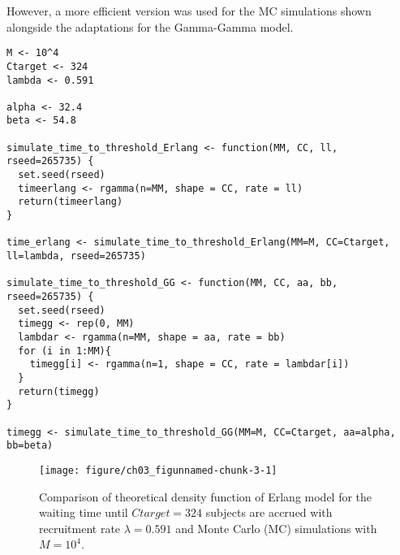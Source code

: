 However, a more efficient version was used for the MC simulations shown alongside the adaptations for the Gamma-Gamma model.

\begin{knitrout}
\color{fgcolor}\begin{kframe}
\begin{verbatim}
M <- 10^4
Ctarget <- 324
lambda <- 0.591

alpha <- 32.4
beta <- 54.8

simulate_time_to_threshold_Erlang <- function(MM, CC, ll, rseed=265735) {
  set.seed(rseed)
  timeerlang <- rgamma(n=MM, shape = CC, rate = ll)
  return(timeerlang)
}

time_erlang <- simulate_time_to_threshold_Erlang(MM=M, CC=Ctarget, ll=lambda, rseed=265735)

simulate_time_to_threshold_GG <- function(MM, CC, aa, bb, rseed=265735) {
  set.seed(rseed)
  timegg <- rep(0, MM)
  lambdar <- rgamma(n=MM, shape = aa, rate = bb)
  for (i in 1:MM){
    timegg[i] <- rgamma(n=1, shape = CC, rate = lambdar[i])
  }
  return(timegg)
}

timegg <- simulate_time_to_threshold_GG(MM=M, CC=Ctarget, aa=alpha, bb=beta) 
\end{verbatim}
\end{kframe}
\end{knitrout}

\begin{figure}
\begin{knitrout}
\color{fgcolor}
\texttt{[image: figure/ch03\_figunnamed-chunk-3-1]} 
\end{knitrout}
\caption{Comparison of theoretical density function of Erlang model for the waiting time until $Ctarget = 324$ subjects are accrued with recruitment rate $\lambda = 0.591$ and Monte Carlo (MC) simulations with $M=10^4$.}
\label{fig:3_3}
\end{figure}


